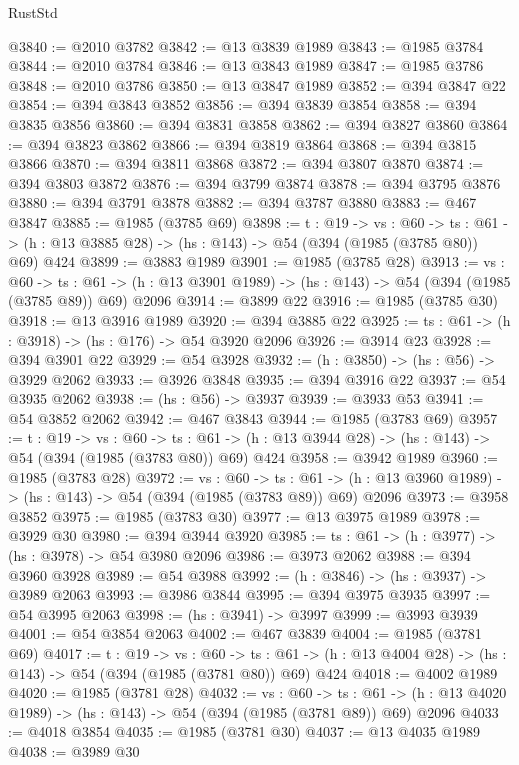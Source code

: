 \begin{lexlean}{RustStd}
\begin{coremodule}
@3840 := @2010 @3782
@3842 := @13 @3839 @1989
@3843 := @1985 @3784
@3844 := @2010 @3784
@3846 := @13 @3843 @1989
@3847 := @1985 @3786
@3848 := @2010 @3786
@3850 := @13 @3847 @1989
@3852 := @394 @3847 @22
@3854 := @394 @3843 @3852
@3856 := @394 @3839 @3854
@3858 := @394 @3835 @3856
@3860 := @394 @3831 @3858
@3862 := @394 @3827 @3860
@3864 := @394 @3823 @3862
@3866 := @394 @3819 @3864
@3868 := @394 @3815 @3866
@3870 := @394 @3811 @3868
@3872 := @394 @3807 @3870
@3874 := @394 @3803 @3872
@3876 := @394 @3799 @3874
@3878 := @394 @3795 @3876
@3880 := @394 @3791 @3878
@3882 := @394 @3787 @3880
@3883 := @467 @3847
@3885 := @1985 (@3785 @69)
@3898 := {t : @19} ->
  {vs : @60} ->
  {ts : @61} -> (h : @13 @3885 @28) -> (hs : @143) -> @54 (@394 (@1985 (@3785 @80)) @69) @424
@3899 := @3883 @1989
@3901 := @1985 (@3785 @28)
@3913 := {vs : @60} ->
  {ts : @61} -> (h : @13 @3901 @1989) -> (hs : @143) -> @54 (@394 (@1985 (@3785 @89)) @69) @2096
@3914 := @3899 @22
@3916 := @1985 (@3785 @30)
@3918 := @13 @3916 @1989
@3920 := @394 @3885 @22
@3925 := {ts : @61} -> (h : @3918) -> (hs : @176) -> @54 @3920 @2096
@3926 := @3914 @23
@3928 := @394 @3901 @22
@3929 := @54 @3928
@3932 := (h : @3850) -> (hs : @56) -> @3929 @2062
@3933 := @3926 @3848
@3935 := @394 @3916 @22
@3937 := @54 @3935 @2062
@3938 := (hs : @56) -> @3937
@3939 := @3933 @53
@3941 := @54 @3852 @2062
@3942 := @467 @3843
@3944 := @1985 (@3783 @69)
@3957 := {t : @19} ->
  {vs : @60} ->
  {ts : @61} -> (h : @13 @3944 @28) -> (hs : @143) -> @54 (@394 (@1985 (@3783 @80)) @69) @424
@3958 := @3942 @1989
@3960 := @1985 (@3783 @28)
@3972 := {vs : @60} ->
  {ts : @61} -> (h : @13 @3960 @1989) -> (hs : @143) -> @54 (@394 (@1985 (@3783 @89)) @69) @2096
@3973 := @3958 @3852
@3975 := @1985 (@3783 @30)
@3977 := @13 @3975 @1989
@3978 := @3929 @30
@3980 := @394 @3944 @3920
@3985 := {ts : @61} -> (h : @3977) -> (hs : @3978) -> @54 @3980 @2096
@3986 := @3973 @2062
@3988 := @394 @3960 @3928
@3989 := @54 @3988
@3992 := (h : @3846) -> (hs : @3937) -> @3989 @2063
@3993 := @3986 @3844
@3995 := @394 @3975 @3935
@3997 := @54 @3995 @2063
@3998 := (hs : @3941) -> @3997
@3999 := @3993 @3939
@4001 := @54 @3854 @2063
@4002 := @467 @3839
@4004 := @1985 (@3781 @69)
@4017 := {t : @19} ->
  {vs : @60} ->
  {ts : @61} -> (h : @13 @4004 @28) -> (hs : @143) -> @54 (@394 (@1985 (@3781 @80)) @69) @424
@4018 := @4002 @1989
@4020 := @1985 (@3781 @28)
@4032 := {vs : @60} ->
  {ts : @61} -> (h : @13 @4020 @1989) -> (hs : @143) -> @54 (@394 (@1985 (@3781 @89)) @69) @2096
@4033 := @4018 @3854
@4035 := @1985 (@3781 @30)
@4037 := @13 @4035 @1989
@4038 := @3989 @30

\end{coremodule}
\end{lexlean}
